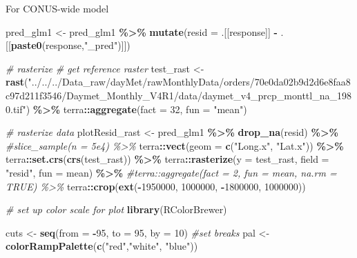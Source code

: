 \documentclass[
]{article}
\newenvironment{Shaded}{\begin{snugshade}}{\end{snugshade}}
\newcommand{\AttributeTok}[1]{\textcolor[rgb]{0.13,0.29,0.53}{#1}}
\newcommand{\CommentTok}[1]{\textcolor[rgb]{0.56,0.35,0.01}{\textit{#1}}}
\newcommand{\DecValTok}[1]{\textcolor[rgb]{0.00,0.00,0.81}{#1}}
\newcommand{\FunctionTok}[1]{\textcolor[rgb]{0.13,0.29,0.53}{\textbf{#1}}}
\newcommand{\NormalTok}[1]{#1}
\newcommand{\OtherTok}[1]{\textcolor[rgb]{0.56,0.35,0.01}{#1}}
\newcommand{\SpecialCharTok}[1]{\textcolor[rgb]{0.81,0.36,0.00}{\textbf{#1}}}
\newcommand{\StringTok}[1]{\textcolor[rgb]{0.31,0.60,0.02}{#1}}
\begin{document}
For CONUS-wide model

\begin{Shaded}
\begin{Highlighting}[]
\NormalTok{pred\_glm1 }\OtherTok{\textless{}{-}}\NormalTok{ pred\_glm1 }\SpecialCharTok{\%\textgreater{}\%} 
  \FunctionTok{mutate}\NormalTok{(}\AttributeTok{resid =}\NormalTok{ .[[response]] }\SpecialCharTok{{-}}\NormalTok{ .[[}\FunctionTok{paste0}\NormalTok{(response,}\StringTok{"\_pred"}\NormalTok{)]]) }

\CommentTok{\# rasterize}
\CommentTok{\# get reference raster}
\NormalTok{test\_rast }\OtherTok{\textless{}{-}}  \FunctionTok{rast}\NormalTok{(}\StringTok{"../../../Data\_raw/dayMet/rawMonthlyData/orders/70e0da02b9d2d6e8faa8c97d211f3546/Daymet\_Monthly\_V4R1/data/daymet\_v4\_prcp\_monttl\_na\_1980.tif"}\NormalTok{) }\SpecialCharTok{\%\textgreater{}\%} 
\NormalTok{  terra}\SpecialCharTok{::}\FunctionTok{aggregate}\NormalTok{(}\AttributeTok{fact =} \DecValTok{32}\NormalTok{, }\AttributeTok{fun =} \StringTok{"mean"}\NormalTok{)}

\CommentTok{\# rasterize data}
\NormalTok{plotResid\_rast }\OtherTok{\textless{}{-}}\NormalTok{ pred\_glm1 }\SpecialCharTok{\%\textgreater{}\%} 
         \FunctionTok{drop\_na}\NormalTok{(resid) }\SpecialCharTok{\%\textgreater{}\%} 
  \CommentTok{\#slice\_sample(n = 5e4) \%\textgreater{}\%}
\NormalTok{  terra}\SpecialCharTok{::}\FunctionTok{vect}\NormalTok{(}\AttributeTok{geom =} \FunctionTok{c}\NormalTok{(}\StringTok{"Long.x"}\NormalTok{, }\StringTok{"Lat.x"}\NormalTok{)) }\SpecialCharTok{\%\textgreater{}\%} 
\NormalTok{  terra}\SpecialCharTok{::}\FunctionTok{set.crs}\NormalTok{(}\FunctionTok{crs}\NormalTok{(test\_rast)) }\SpecialCharTok{\%\textgreater{}\%} 
\NormalTok{  terra}\SpecialCharTok{::}\FunctionTok{rasterize}\NormalTok{(}\AttributeTok{y =}\NormalTok{ test\_rast, }
                   \AttributeTok{field =} \StringTok{"resid"}\NormalTok{, }
                   \AttributeTok{fun =}\NormalTok{ mean) }\SpecialCharTok{\%\textgreater{}\%} 
  \CommentTok{\#terra::aggregate(fact = 2, fun = mean, na.rm = TRUE) \%\textgreater{}\% }
\NormalTok{  terra}\SpecialCharTok{::}\FunctionTok{crop}\NormalTok{(}\FunctionTok{ext}\NormalTok{(}\SpecialCharTok{{-}}\DecValTok{1950000}\NormalTok{, }\DecValTok{1000000}\NormalTok{, }\SpecialCharTok{{-}}\DecValTok{1800000}\NormalTok{, }\DecValTok{1000000}\NormalTok{))}

\CommentTok{\# set up color scale for plot}
\FunctionTok{library}\NormalTok{(RColorBrewer)}

\NormalTok{cuts }\OtherTok{\textless{}{-}} \FunctionTok{seq}\NormalTok{(}\AttributeTok{from =} \SpecialCharTok{{-}}\DecValTok{95}\NormalTok{, }\AttributeTok{to =} \DecValTok{95}\NormalTok{, }\AttributeTok{by =} \DecValTok{10}\NormalTok{) }\CommentTok{\#set breaks}
\NormalTok{pal }\OtherTok{\textless{}{-}} \FunctionTok{colorRampPalette}\NormalTok{(}\FunctionTok{c}\NormalTok{(}\StringTok{"red"}\NormalTok{,}\StringTok{"white"}\NormalTok{, }\StringTok{"blue"}\NormalTok{))}


\end{Highlighting}
\end{Shaded}
\end{document}
